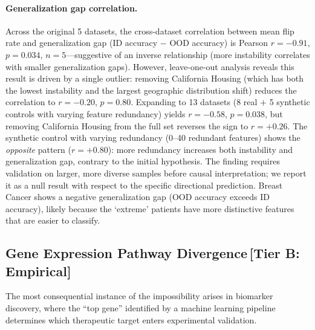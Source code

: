 \documentclass[11pt,a4paper]{article}
\begin{document}
\paragraph{Generalization gap correlation.}
Across the original 5 datasets, the cross-dataset correlation between mean flip rate and generalization gap (ID accuracy $-$ OOD accuracy) is Pearson $r = -0.91$, $p = 0.034$, $n = 5$---suggestive of an inverse relationship (more instability correlates with smaller generalization gaps).  However, leave-one-out analysis reveals this result is driven by a single outlier: removing California Housing (which has both the lowest instability and the largest geographic distribution shift) reduces the correlation to $r = -0.20$, $p = 0.80$.  Expanding to 13 datasets (8 real $+$ 5 synthetic controls with varying feature redundancy) yields $r = -0.58$, $p = 0.038$, but removing California Housing from the full set reverses the sign to $r = +0.26$.  The synthetic control with varying redundancy (0--40 redundant features) shows the \emph{opposite} pattern ($r = +0.80$): more redundancy increases both instability and generalization gap, contrary to the initial hypothesis.  The finding requires validation on larger, more diverse samples before causal interpretation; we report it as a null result with respect to the specific directional prediction.  Breast Cancer shows a negative generalization gap (OOD accuracy exceeds ID accuracy), likely because the `extreme' patients have more distinctive features that are easier to classify.

\subsection{Gene Expression Pathway Divergence\,\textnormal{\normalsize[Tier B: Empirical]}}
\label{sec:gene-expression}

The most consequential instance of the impossibility arises in biomarker discovery, where the ``top gene'' identified by a machine learning pipeline determines which therapeutic target enters experimental validation.
\end{document}
